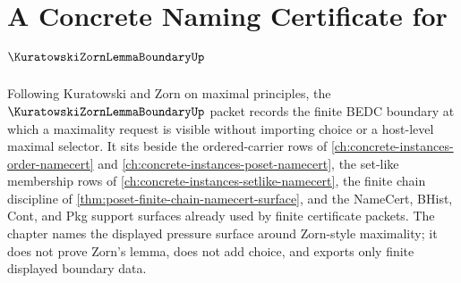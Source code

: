 \chapter{A Concrete Naming Certificate for $\KuratowskiZornLemmaBoundaryUp$}
\label{ch:concrete-instances-kuratowski-zorn-lemma-boundary-namecert}

Following Kuratowski and Zorn on maximal principles, the $\KuratowskiZornLemmaBoundaryUp$ packet records the finite BEDC boundary at which a maximality request is visible without importing choice or a host-level maximal selector. It sits beside the ordered-carrier rows of \autoref{ch:concrete-instances-order-namecert} and \autoref{ch:concrete-instances-poset-namecert}, the set-like membership rows of \autoref{ch:concrete-instances-setlike-namecert}, the finite chain discipline of \autoref{thm:poset-finite-chain-namecert-surface}, and the NameCert, BHist, Cont, and Pkg support surfaces already used by finite certificate packets. The chapter names the displayed pressure surface around Zorn-style maximality; it does not prove Zorn's lemma, does not add choice, and exports only finite displayed boundary data.

